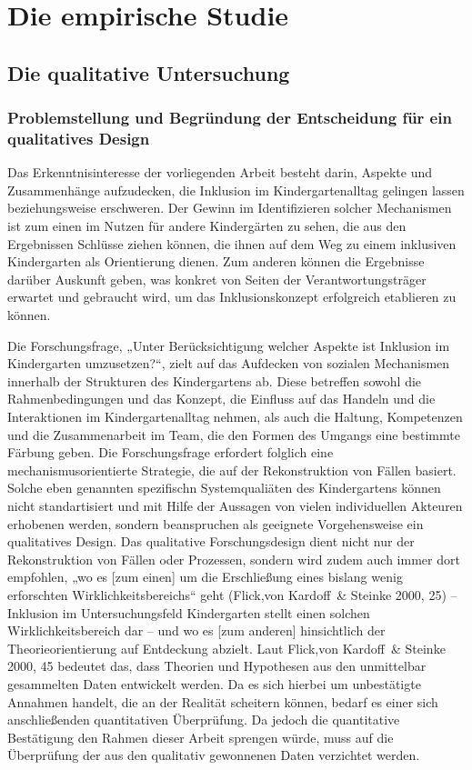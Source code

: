 \part{Die empirische Studie}
\chapter{Die qualitative Untersuchung}
\section{Problemstellung und Begründung der Entscheidung für ein qualitatives Design}
Das Erkenntnisinteresse der vorliegenden Arbeit besteht darin, Aspekte und Zusammenhänge aufzudecken, die Inklusion im Kindergartenalltag gelingen lassen beziehungsweise erschweren. Der Gewinn im Identifizieren solcher Mechanismen ist zum einen im Nutzen für andere Kindergärten zu sehen, die aus den Ergebnissen Schlüsse ziehen können, die ihnen auf dem Weg zu einem inklusiven Kindergarten als Orientierung dienen. Zum anderen können die Ergebnisse darüber Auskunft geben, was konkret von Seiten der Verantwortungsträger erwartet und gebraucht wird, um das Inklusionskonzept erfolgreich etablieren zu können.

Die Forschungsfrage, „Unter Berücksichtigung welcher Aspekte ist Inklusion im Kindergarten umzusetzen?“, zielt auf das Aufdecken von sozialen Mechanismen innerhalb der Strukturen des Kindergartens ab. Diese betreffen sowohl die Rahmenbedingungen und das Konzept, die  Einfluss auf das Handeln und die Interaktionen im Kindergartenalltag nehmen, als auch die Haltung, Kompetenzen und die Zusammenarbeit im Team, die den Formen des Umgangs eine bestimmte Färbung geben. Die Forschungsfrage erfordert folglich eine mechanismusorientierte Strategie, die auf der Rekonstruktion von Fällen basiert. Solche eben genannten spezifischn Systemqualiäten des Kindergartens können nicht standartisiert und mit Hilfe der Aussagen von vielen individuellen Akteuren erhobenen werden, sondern beanspruchen als geeignete Vorgehensweise ein  
qualitatives Design. Das qualitative Forschungsdesign dient nicht nur der Rekonstruktion von Fällen oder Prozessen, sondern wird zudem auch immer dort empfohlen, „wo es [zum einen] um die Erschließung eines bislang wenig erforschten Wirklichkeitsbereichs“ geht (Flick,von Kardoff~\& Steinke 2000, 25) -- Inklusion im Untersuchungsfeld Kindergarten stellt einen solchen Wirklichkeitsbereich dar -- und wo es [zum anderen] hinsichtlich der Theorieorientierung auf Entdeckung abzielt.
Laut Flick,von Kardoff~\& Steinke 2000, 45 bedeutet das, dass Theorien und Hypothesen aus den unmittelbar gesammelten Daten entwickelt werden. Da es sich hierbei um unbestätigte Annahmen handelt, die an der Realität scheitern können, bedarf es einer sich anschließenden  quantitativen Überprüfung. 
Da jedoch die quantitative Bestätigung den Rahmen dieser Arbeit sprengen würde, muss auf die Überprüfung der aus den qualitativ gewonnenen Daten verzichtet werden.

